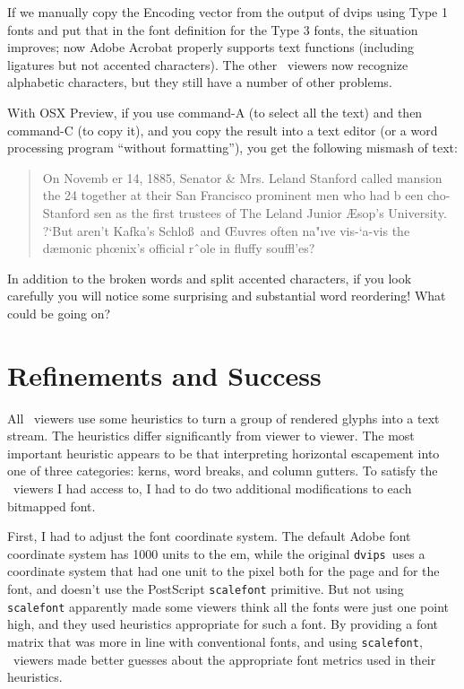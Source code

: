 \documentclass{ltugboat}
\def\PDF{\acro{PDF}}
\def\dvips{\texttt{dvips}}
\begin{document}
If we manually copy the Encoding vector from
the output of dvips using Type 1 fonts and put that
in the font definition for the Type 3 fonts, the situation
improves; now Adobe Acrobat properly supports text
functions (including ligatures but not accented
characters).  The other \PDF\ viewers now recognize
alphabetic characters, but they still have a number of
other problems.

With OSX Preview, if you use command-A
(to select all the text) and then command-C (to copy
it), and you copy the result into a text editor (or
a word processing program ``without formatting''),
you get the following mismash of text:

\begin{quote}
\raggedright
On Novemb er 14, 1885, Senator \& Mrs. Leland
Stanford called
mansion the 24
together at their San Francisco
prominent men who had
b een cho-
Stanford
sen as the first trustees of The Leland
Junior
{\AE}sop’s
University. ?`But aren’t Kafka’s Schlo\ss\ and
{\OE}uvres often na"ıve vis-`a-vis the dæmonic
ph{\oe}nix’s official rˆole in fluffy souffl'es?
\end{quote}
\noindent
In addition to the broken words and split accented
characters, if you look carefully you will notice
some surprising
and substantial word reordering!  What could
be going on?

\section{Refinements and Success}

All \PDF\ viewers use some heuristics
to turn a group of rendered glyphs into a text stream.
The heuristics differ significantly from viewer to
viewer.  The most important heuristic appears to be
that interpreting horizontal escapement into one of
three categories: kerns, word breaks, and column
gutters.  To satisfy the \PDF\ viewers I had access to,
I had to do two additional modifications to each bitmapped
font.

First, I had to adjust the font coordinate system.
The default Adobe font coordinate system has 1000 units
to the em, while the original
\dvips\ uses a coordinate system that had one unit to the
pixel both for the page and for the font, and doesn't use
the PostScript \texttt{scalefont} primitive.  But not using
\texttt{scalefont} apparently made some viewers think all the
fonts were just one point high, and they used heuristics
appropriate for such a font.  By providing a font matrix
that was more in line with conventional fonts, and using
\texttt{scalefont}, \PDF\ viewers made better guesses about
the appropriate font metrics used in their heuristics.
\end{document}
